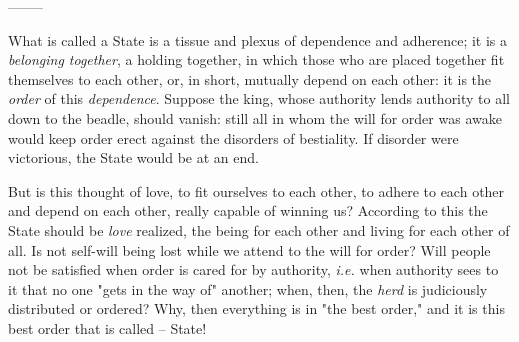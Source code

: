 \documentclass[a4paper]{book}
\begin{document}
\begin{center}
--------\end{center}


What is called a State is a tissue and plexus of dependence and adherence; it 
is a \textit{belonging together}, a holding together, in which those who are 
placed together fit themselves to each other, or, in short, mutually depend on 
each other: it is the \textit{order} of this \textit{dependence}. Suppose the 
king, whose authority lends authority to all down to the beadle, should 
vanish: still all in whom the will for order was awake would keep order erect 
against the disorders of bestiality. If disorder were victorious, the State 
would be at an end.

But is this thought of love, to fit ourselves to each other, to adhere to each 
other and depend on each other, really capable of winning us? According to 
this the State should be \textit{love} realized, the being for each other and 
living for each other of all. Is not self-will being lost while we attend to 
the will for order? Will people not be satisfied when order is cared for by 
authority, \textit{i.e.} when authority sees to it that no one "{}gets in the 
way of"{} another; when, then, the \textit{herd} is judiciously distributed or 
ordered? Why, then everything is in "{}the best order,"{} and it is this best 
order that is called -- State!
\end{document}
